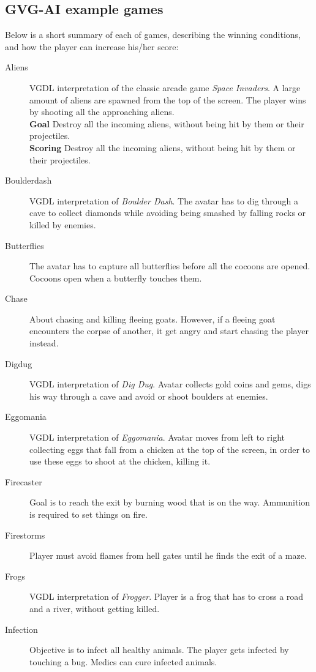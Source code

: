 \documentclass[a4paper,titlepage,final]{report}
\begin{document}
\begin{appendices}
\chapter{GVG-AI example games}
\label{app_gvgaigames}
Below is a short summary of each of games, describing the winning conditions, and how the player can increase his/her score:
\begin{description}
\item [Aliens] VGDL interpretation of the classic arcade game \emph{Space Invaders}. A large amount of aliens are spawned from the top of the screen. The player wins by shooting all the approaching aliens.\\
\textbf{Goal} Destroy all the incoming aliens, without being hit by them or their projectiles.\\
\textbf{Scoring} Destroy all the incoming aliens, without being hit by them or their projectiles.
\item [Boulderdash] VGDL interpretation of \emph{Boulder Dash}. The avatar has to dig through a cave to collect diamonds while avoiding being smashed by falling rocks or killed by enemies. 
\item [Butterflies] The avatar has to capture all butterflies before all the cocoons are opened. Cocoons open when a butterfly touches them.
\item [Chase] About chasing and killing fleeing goats. However, if a fleeing goat encounters the corpse of another, it get angry and start chasing the player instead.
\item [Digdug] VGDL interpretation of \emph{Dig Dug}. Avatar collects gold coins and gems, digs his way through a cave and avoid or shoot boulders at enemies.
\item [Eggomania] VGDL interpretation of \emph{Eggomania}. Avatar moves from left to right collecting eggs that fall from a chicken at the top of the screen, in order to use these eggs to shoot at the chicken, killing it.
\item [Firecaster] Goal is to reach the exit by burning wood that is on the way. Ammunition is required to set things on fire.
\item [Firestorms] Player must avoid flames from hell gates until he finds the exit of a maze.
\item [Frogs] VGDL interpretation of \emph{Frogger}. Player is a frog that has to cross a road and a river, without getting killed.
\item [Infection] Objective is to infect all healthy animals. The player gets infected by touching a bug. Medics can cure infected animals.

\end{description}
\end{appendices}
\end{document}
